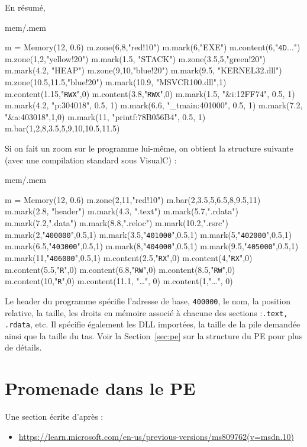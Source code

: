 \documentclass{book}
\newcounter{Qcours}
\newenvironment{memory}{%
	\noindent
	\VerbatimEnvironment\stepcounter{Qcours}%
	\begin{VerbatimOut}{mem/\theQcours.mem}%
	}{\end{VerbatimOut}%
}
\newcommand{\code}[1]{\texttt{#1}}
\begin{document}
En résumé, 

\medskip
\begin{memory}
m = Memory(12, 0.6)
m.zone(6,8,"red!10")
m.mark(6,"EXE")
m.content(6,"$\code{4D}\ldots$")
m.zone(1,2,"yellow!20")
m.mark(1.5, "STACK")
m.zone(3.5,5,"green!20")
m.mark(4.2, "HEAP")
m.zone(9,10,"blue!20")
m.mark(9.5, "KERNEL32.dll")
m.zone(10.5,11.5,"blue!20")
m.mark(10.9, "MSVCR100.dll",1)
m.content(1.15,"\code{RWX}",0)
m.content(3.8,"\code{RWX}",0)
m.mark(1.5, "\&i:12FF74", 0.5, 1)
m.mark(4.2, "p:304018", 0.5, 1)
m.mark(6.6, "\_tmain:401000", 0.5, 1)
m.mark(7.2, "\&a:403018",1,0)
m.mark(11, "printf:78B056B4", 0.5, 1)
m.bar(1,2,8,3.5,5,9,10,10.5,11.5)
\end{memory}

Si on fait un zoom sur le programme lui-même, on obtient la structure suivante (avec une compilation standard sous VisualC) : 

\bigskip
\begin{memory}
m = Memory(12, 0.6)
m.zone(2,11,"red!10")
m.bar(2,3.5,5,6.5,8,9.5,11)
m.mark(2.8, "header")
m.mark(4.3, ".text")
m.mark(5.7,".rdata")
m.mark(7.2,".data")
m.mark(8.8,".reloc")
m.mark(10.2,".rsrc")
m.mark(2,"\code{400000}",0.5,1)
m.mark(3.5,"\code{401000}",0.5,1)
m.mark(5,"\code{402000}",0.5,1)
m.mark(6.5,"\code{403000}",0.5,1)
m.mark(8,"\code{404000}",0.5,1)
m.mark(9.5,"\code{405000}",0.5,1)
m.mark(11,"\code{406000}",0.5,1)
m.content(2.5,"\code{RX}",0)
m.content(4,"\code{RX}",0)
m.content(5.5,"\code{R}",0)
m.content(6.8,"\code{RW}",0)
m.content(8.5,"\code{RW}",0)
m.content(10,"\code{R}",0)
m.content(11.1, "\ldots", 0)
m.content(1,"\ldots", 0)
\end{memory}

Le header du programme spécifie l'adresse de base, \code{400000}, le nom, la position relative, la taille, les droits en mémoire associé à chacune des sections :\code{.text, .rdata}, etc. Il spécifie également les DLL importées, la taille de la pile demandée ainsi que la taille du tas. Voir la Section~\ref{sec:pe} sur la structure du PE pour plus de détails. 


\section{Promenade dans le PE}

Une section écrite d'après : 
\begin{itemize}
	\item \url{https://learn.microsoft.com/en-us/previous-versions/ms809762(v=msdn.10)}
\end{itemize}
\end{document}
